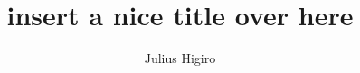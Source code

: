 \documentclass{article}
\title{insert a nice title over here}
\author{Julius Higiro}
\begin{document}








\pagebreak


\end{document}
